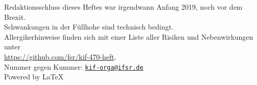 Redaktionsschluss dieses Heftes war irgendwann Anfang 2019, noch vor dem Brexit.\\%
Schwankungen in der Füllhohe sind technisch bedingt.\\[1\baselineskip]

Allergikerhinweise finden sich mit einer Liste aller Risiken und Nebenwirkungen unter\\
\url{https://github.com/fsr/kif-470-heft}.\\[1\baselineskip]

Nummer gegen Kummer: \href{mailto:kif-orga@ifsr.de}{\texttt{kif-orga@ifsr.de}}\\[1\baselineskip]

Powered by \LaTeX%
